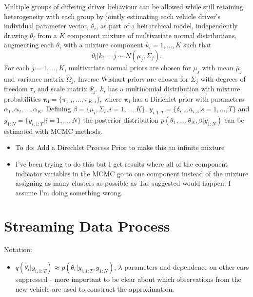 \documentclass[12pt,a4paper]{article}\usepackage[]{graphicx}\usepackage[]{color}
\begin{document}
Multiple groups of differing driver behaviour can be allowed while still retaining heterogeneity with each group by jointly estimating each vehicle driver's individual parameter vector, $\theta_i$, as part of a heirarchical model, independently drawing $\theta_i$ from a $K$ component mixture of multivariate normal distributions, augmenting each $\theta_i$ with a mixture component $k_i = 1, \dots, K$ such that 
\begin{equation}
\theta_i | k_i = j \sim N(\mu_j, \Sigma_j).
\end{equation}
For each $j = 1, \dots, K$, multivariate normal priors are chosen for $\mu_j$ with mean $\bar{\mu}_j$ and variance matrix $\Omega_j$, Inverse Wishart priors are chosen for $\Sigma_j$ with degrees of freedom $\tau_j$ and scale matrix $\Psi_j$. $k_{i}$ has a multinomial distribution with mixture probabilities $\boldsymbol{\pi_i} = \{\pi_{1, i}, \dots, \pi_{K, i}\}$, where $\boldsymbol{\pi_i}$ has a Dirichlet prior with parameters $\alpha_1, \alpha_2, \dots, \alpha_K$. Defining $\beta = \{\mu_i, \Sigma_i, i = 1, \dots, K\}$, $y_{i, 1:T} = \{\delta_{i, s}, a_{i, s} | s = 1, \dots, T\}$ and $y_{1:N} = \{y_{i, 1:T} | i = 1, \dots, N\}$ the posterior distribution $p(\theta_1, \dots, \theta_N, \beta | y_{1:N})$ can be estimated with MCMC methods.


\begin{itemize}
\item To do: Add a Direchlet Process Prior to make this an infinite mixture
\item I've been trying to do this but I get results where all of the component indicator variables in the MCMC go to one component instead of the mixture assigning as many clusters as possible as Tas suggested would happen. I assume I'm doing something wrong.
\end{itemize}

\section{Streaming Data Process}

Notation:
\begin{itemize}
\item $q(\theta_i | y_{i, 1:T}) \approx p(\theta_i | y_{i, 1:T}, y_{1:N})$, $\lambda$ parameters and dependence on other cars suppressed - more important to be clear about which observations from the new vehicle are used to construct the approximation.
\end{itemize}
\end{document}

